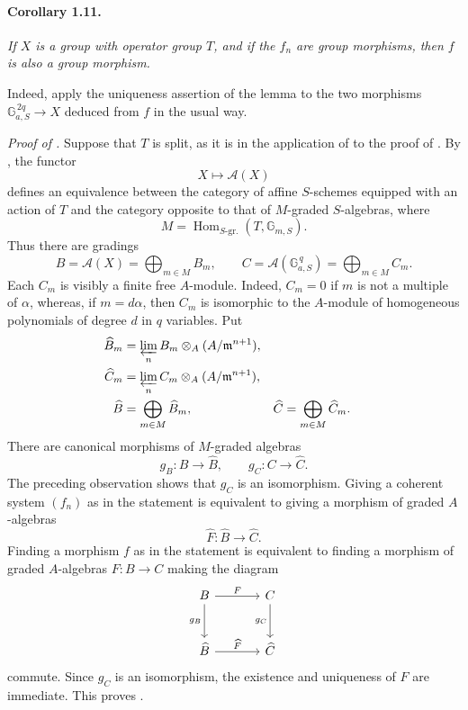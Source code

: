 \paragraph{\textbf{Corollary 1.11.}}
\emph{If \(X\) is a group with operator group \(T\), and if the
\(f_n\) are group morphisms, then \(f\) is also a group morphism.}

Indeed, apply the uniqueness assertion of the lemma to the two
morphisms
\(\mathbb G_{a,S}^{\,2q}\to X\) deduced from \(f\) in the usual
way.

\medskip
\noindent\emph{Proof of .}
Suppose that \(T\) is split, as it is in the application of  to
the proof of . By , the functor
\[
  X\longmapsto\mathscr A(X)
\]
defines an equivalence between the category of affine \(S\)-schemes
equipped with an action of \(T\) and the category opposite to that
of \(M\)-graded \(S\)-algebras, where
\[
  M=\operatorname{Hom}_{S\text{-gr.}}(T,\mathbb G_{m,S}).
\]
Thus there are gradings
\[
  B=\mathscr A(X)=\bigoplus_{m\in M}B_m,
  \qquad
  C=\mathscr A(\mathbb G_{a,S}^{\,q})
    =\bigoplus_{m\in M}C_m.
\]
Each \(C_m\) is visibly a finite free \(A\)-module. Indeed,
\(C_m=0\) if \(m\) is not a multiple of \(\alpha\), whereas, if
\(m=d\alpha\), then \(C_m\) is isomorphic to the \(A\)-module of
homogeneous polynomials of degree \(d\) in \(q\) variables. Put
\[
\begin{aligned}
  \widehat B_m
    &=\varprojlim_n B_m\otimes_A(A/\mathfrak m^{n+1}),\\
  \widehat C_m
    &=\varprojlim_n C_m\otimes_A(A/\mathfrak m^{n+1}),\\
  \widehat B&=\bigoplus_{m\in M}\widehat B_m,
  &\widehat C&=\bigoplus_{m\in M}\widehat C_m.
\end{aligned}
\]
There are canonical morphisms of \(M\)-graded algebras
\[
  g_B\colon B\longrightarrow\widehat B,
  \qquad
  g_C\colon C\longrightarrow\widehat C.
\]
The preceding observation shows that \(g_C\) is an isomorphism.
Giving a coherent system \((f_n)\) as in the statement is
equivalent to giving a morphism of graded \(A\)-algebras
\[
  \widehat F\colon\widehat B\longrightarrow\widehat C.
\]
Finding a morphism \(f\) as in the statement is equivalent to
finding a morphism of graded \(A\)-algebras \(F\colon B\to C\)
making the diagram
\[
\begin{tikzcd}[column sep=large,row sep=large]
B \arrow[r,"F"] \arrow[d,"g_B"']
  & C \arrow[d,"g_C"']\\
\widehat B \arrow[r,"\widehat F"]
  & \widehat C
\end{tikzcd}
\]
commute. Since \(g_C\) is an isomorphism, the existence and
uniqueness of \(F\) are immediate. This proves .

